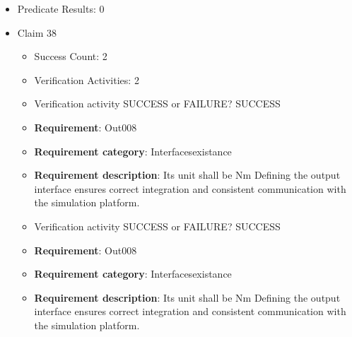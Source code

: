 \documentclass{article}
\begin{document}
\begin{itemize}
\begin{itemize}
						\item \textbf{Requirement}: Out007 
						\item \textbf{Requirement category}: Interfacesexistance 
						\item \textbf{Requirement description}: Its unit shall be percent Defining the output interface ensures correct integration and consistent communication with the simulation platform.
					
					\item Verification activity SUCCESS or FAILURE? SUCCESS
		
						\item \textbf{Requirement}: Out007 
						\item \textbf{Requirement category}: Interfacesexistance 
						\item \textbf{Requirement description}: Its unit shall be percent Defining the output interface ensures correct integration and consistent communication with the simulation platform.
					
				\end{itemize}
				
									    
				\item Predicate Results: 0

  				  \item Claim 38
				\begin{itemize}
			    	\item Success Count: 2 
			    	\item Verification Activities: 2
					\item Verification activity SUCCESS or FAILURE? SUCCESS
		
						\item \textbf{Requirement}: Out008 
						\item \textbf{Requirement category}: Interfacesexistance 
						\item \textbf{Requirement description}: Its unit shall be Nm Defining the output interface ensures correct integration and consistent communication with the simulation platform.
					
					\item Verification activity SUCCESS or FAILURE? SUCCESS
		
						\item \textbf{Requirement}: Out008 
						\item \textbf{Requirement category}: Interfacesexistance 
						\item \textbf{Requirement description}: Its unit shall be Nm Defining the output interface ensures correct integration and consistent communication with the simulation platform.
					

\end{itemize}
\end{itemize}
\end{document}

